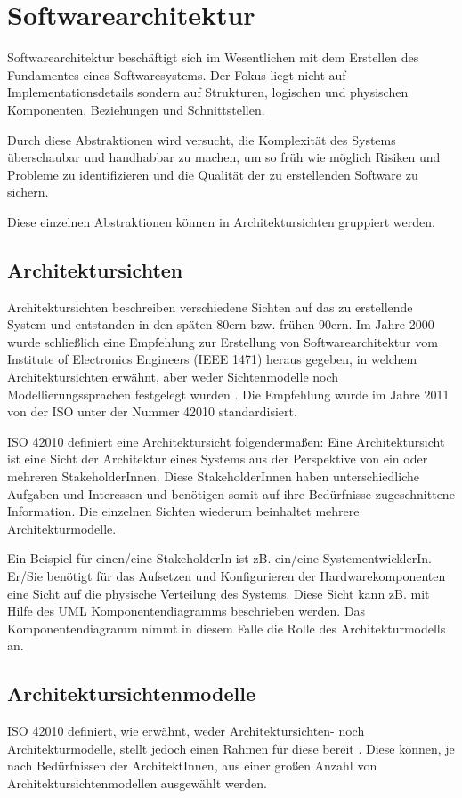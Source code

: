 \chapter{Softwarearchitektur}
Softwarearchitektur beschäftigt sich im Wesentlichen mit dem Erstellen des Fundamentes eines Softwaresystems. Der Fokus liegt nicht auf Implementationsdetails sondern auf Strukturen, logischen und physischen Komponenten, Beziehungen und Schnittstellen. \cite[S. 9-10]{softarch}

Durch diese Abstraktionen wird versucht, die Komplexität des Systems \glqq überschaubar und handhabbar\grqq \cite[S. 10]{softarch} zu machen, um so früh wie möglich Risiken und Probleme zu identifizieren und die Qualität der zu erstellenden Software zu sichern. \cite[S. 10]{softarch}

Diese einzelnen Abstraktionen können in Architektursichten gruppiert werden.

\section{Architektursichten}
Architektursichten beschreiben verschiedene Sichten auf das zu erstellende System und entstanden in den späten 80ern bzw. frühen 90ern. Im Jahre 2000 wurde schließlich eine Empfehlung zur Erstellung von Softwarearchitektur vom Institute of Electronics Engineers (IEEE 1471) heraus gegeben, in welchem Architektursichten erwähnt, aber weder Sichtenmodelle noch Modellierungssprachen festgelegt wurden \cite{ISO_ARCH_OLD}\cite[S. 138]{basiswissen}. Die Empfehlung wurde im Jahre 2011 von der ISO unter der Nummer 42010 standardisiert\cite{ISO_ARCH}.

ISO 42010 definiert eine Architektursicht folgendermaßen: Eine Architektursicht ist eine Sicht der Architektur eines Systems aus der Perspektive von ein oder mehreren StakeholderInnen. Diese StakeholderInnen haben unterschiedliche Aufgaben und Interessen und benötigen somit auf ihre Bedürfnisse zugeschnittene Information. Die einzelnen Sichten wiederum beinhaltet mehrere Architekturmodelle. \cite{ISO_ARCH}

Ein Beispiel für einen/eine StakeholderIn ist zB. ein/eine SystementwicklerIn. Er/Sie benötigt für das Aufsetzen und Konfigurieren der Hardwarekomponenten eine Sicht auf die physische Verteilung des Systems. Diese Sicht kann zB. mit Hilfe des UML Komponentendiagramms beschrieben werden. Das Komponentendiagramm nimmt in diesem Falle die Rolle des Architekturmodells an.

\section{Architektursichtenmodelle}
ISO 42010 definiert, wie erwähnt, weder Architektursichten- noch Architekturmodelle, stellt jedoch einen Rahmen für diese bereit
\cite[S. 138]{basiswissen}. Diese können, je nach Bedürfnissen der ArchitektInnen, aus einer großen Anzahl von Architektursichtenmodellen ausgewählt werden. \cite[S. 142-145]{basiswissen}

